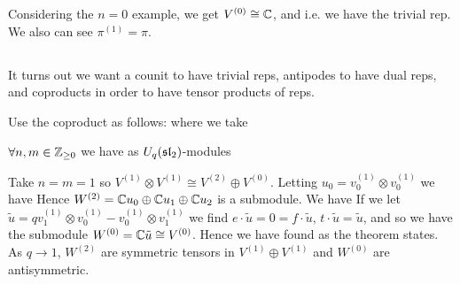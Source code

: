 \documentclass{article}
\begin{document}
\begin{remark}
Considering the $n=0$ example, we get $V^{(0)} \cong \mathbb{C}$, and 
i.e. we have the trivial rep. We also can see $\pi^{(1)} = \pi$. 
\end{remark}

\subsection{}

\begin{idea}
It turns out we want a counit to have trivial reps, antipodes to have dual reps, and coproducts in order to have tensor products of reps. 
\end{idea}

Use the coproduct as follows: 
where we take 

\begin{theorem}
$\forall n,m \in \mathbb{Z}_{\geq 0}$ we have 
as $U_q(\mathfrak{sl}_2)$-modules
\end{theorem}

\begin{example}
Take $n=m=1$ so $V^{(1)} \otimes V^{(1)} \cong V^{(2)} \oplus V^{(0)}$. Letting $u_0 = v_0^{(1)} \otimes v_0^{(1)}$ we have   
Hence $W^{(2)} = \mathbb{C} u_0 \oplus \mathbb{C} u_1 \oplus \mathbb{C} u_2$ is a submodule. We have 
If we let $\tilde{u} = q v_1^{(1)} \otimes v_0^{(1)} - v_0^{(1)} \otimes v_1^{(1)}$ we find $e \cdot \tilde{u} = 0 = f \cdot \tilde{u}, \, t \cdot \tilde{u} = \tilde{u}$, and so we have the submodule $W^{(0)} = \mathbb{C} \tilde{u} \cong V^{(0)}$. Hence we have found 
as the theorem states. As $q \to 1$, $W^{(2)}$ are symmetric tensors in $V^{(1)} \oplus V^{(1)}$ and $W^{(0)}$ are antisymmetric. 
\end{example}
\end{document}
